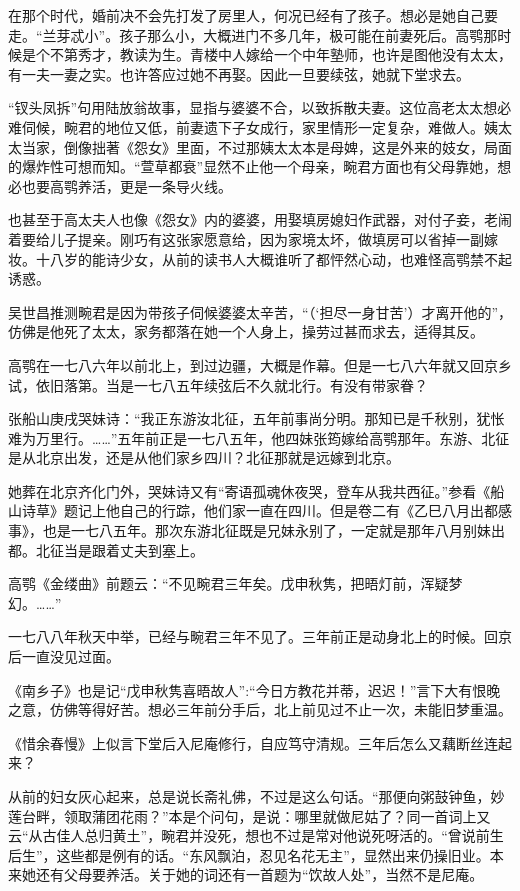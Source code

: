 \par 在那个时代，婚前决不会先打发了房里人，何况已经有了孩子。想必是她自己要走。“兰芽忒小”。孩子那么小，大概进门不多几年，极可能在前妻死后。高鹗那时候是个不第秀才，教读为生。青楼中人嫁给一个中年塾师，也许是图他没有太太，有一夫一妻之实。也许答应过她不再娶。因此一旦要续弦，她就下堂求去。
\par “钗头凤拆”句用陆放翁故事，显指与婆婆不合，以致拆散夫妻。这位高老太太想必难伺候，畹君的地位又低，前妻遗下子女成行，家里情形一定复杂，难做人。姨太太当家，倒像拙著《怨女》里面，不过那姨太太本是母婢，这是外来的妓女，局面的爆炸性可想而知。“萱草都衰”显然不止他一个母亲，畹君方面也有父母靠她，想必也要高鹗养活，更是一条导火线。
\par 也甚至于高太夫人也像《怨女》内的婆婆，用娶填房媳妇作武器，对付子妾，老闹着要给儿子提亲。刚巧有这张家愿意给，因为家境太坏，做填房可以省掉一副嫁妆。十八岁的能诗少女，从前的读书人大概谁听了都怦然心动，也难怪高鹗禁不起诱惑。
\par 吴世昌推测畹君是因为带孩子伺候婆婆太辛苦，“（‘担尽一身甘苦’）才离开他的”，仿佛是他死了太太，家务都落在她一个人身上，操劳过甚而求去，适得其反。
\par 高鹗在一七八六年以前北上，到过边疆，大概是作幕。但是一七八六年就又回京乡试，依旧落第。当是一七八五年续弦后不久就北行。有没有带家眷？
\par 张船山庚戌哭妹诗：“我正东游汝北征，五年前事尚分明。那知已是千秋别，犹怅难为万里行。……”五年前正是一七八五年，他四妹张筠嫁给高鹗那年。东游、北征是从北京出发，还是从他们家乡四川？北征那就是远嫁到北京。
\par 她葬在北京齐化门外，哭妹诗又有“寄语孤魂休夜哭，登车从我共西征。”参看《船山诗草》题记上他自己的行踪，他们家一直在四川。但是卷二有《乙巳八月出都感事》，也是一七八五年。那次东游北征既是兄妹永别了，一定就是那年八月别妹出都。北征当是跟着丈夫到塞上。
\par 高鹗《金缕曲》前题云：“不见畹君三年矣。戊申秋隽，把晤灯前，浑疑梦幻。……”
\par 一七八八年秋天中举，已经与畹君三年不见了。三年前正是动身北上的时候。回京后一直没见过面。
\par 《南乡子》也是记“戊申秋隽喜晤故人”:“今日方教花并蒂，迟迟！”言下大有恨晚之意，仿佛等得好苦。想必三年前分手后，北上前见过不止一次，未能旧梦重温。
\par 《惜余春慢》上似言下堂后入尼庵修行，自应笃守清规。三年后怎么又藕断丝连起来？
\par 从前的妇女灰心起来，总是说长斋礼佛，不过是这么句话。“那便向粥鼓钟鱼，妙莲台畔，领取蒲团花雨？”本是个问句，是说：哪里就做尼姑了？同一首词上又云“从古佳人总归黄土”，畹君并没死，想也不过是常对他说死呀活的。“曾说前生后生”，这些都是例有的话。“东风飘泊，忍见名花无主”，显然出来仍操旧业。本来她还有父母要养活。关于她的词还有一首题为“饮故人处”，当然不是尼庵。
